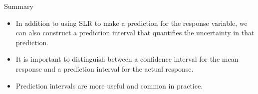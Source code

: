 \documentclass[10pt]{beamer}
\begin{document}
\begin{frame}{Summary}
\begin{itemize}
\item In addition to using SLR to make a prediction for the response variable, we can also construct a prediction interval that quantifies the uncertainty in that prediction.\\
\vspace{10pt}
\item It is important to distinguish between a confidence interval for the mean response and a prediction interval for the actual response.\\
\vspace{10pt}
\item Prediction intervals are more useful and common in practice. 
\end{itemize}
\end{frame}
\end{document}
